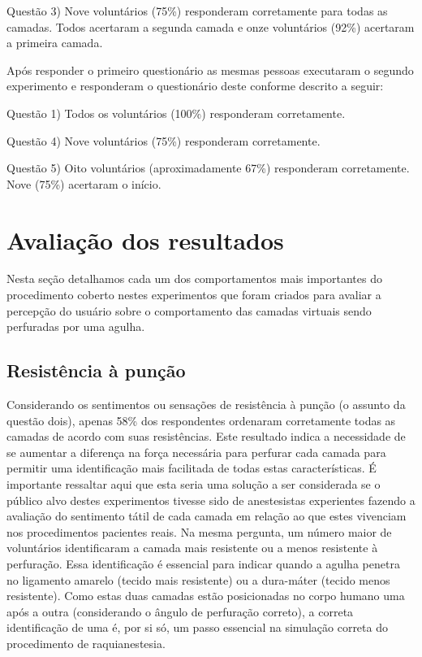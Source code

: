 Questão 3) Nove voluntários (75\%) responderam corretamente para todas as camadas. Todos acertaram a segunda camada e onze voluntários (92\%) acertaram a primeira camada. 

Após responder o primeiro questionário as mesmas pessoas executaram o segundo experimento e responderam o questionário deste conforme descrito a seguir:

Questão 1) Todos os voluntários (100\%) responderam corretamente.

Questão 4) Nove voluntários (75\%) responderam corretamente.

Questão 5) Oito voluntários (aproximadamente 67\%) responderam corretamente. Nove (75\%) acertaram o início.

\section{Avaliação dos resultados}
\label{sec:avaliacao}

Nesta seção detalhamos cada um dos comportamentos mais importantes do procedimento coberto nestes experimentos que foram criados para avaliar a percepção do usuário sobre o comportamento das
camadas virtuais sendo perfuradas por uma agulha.

\subsection{Resistência à punção}

Considerando os sentimentos ou sensações de resistência à punção (o assunto da questão dois), apenas 58\% dos respondentes ordenaram corretamente todas as camadas de acordo com suas resistências. Este resultado indica a necessidade de se aumentar a diferença na força necessária para perfurar cada camada para permitir uma identificação mais facilitada de todas estas características. É importante ressaltar aqui que esta seria uma solução a ser considerada se o público alvo destes experimentos tivesse sido de anestesistas experientes fazendo a avaliação do sentimento tátil de cada camada em relação ao que estes vivenciam nos procedimentos pacientes reais. Na mesma pergunta, um número maior de voluntários identificaram a camada mais resistente ou a menos resistente à perfuração. Essa identificação é essencial para indicar quando a agulha penetra no ligamento amarelo (tecido mais resistente) ou a dura-máter (tecido menos resistente). Como estas duas camadas estão posicionadas no corpo humano uma após a outra (considerando o ângulo de perfuração correto), a correta identificação de uma é, por si só, um passo essencial na simulação correta do procedimento de raquianestesia.

